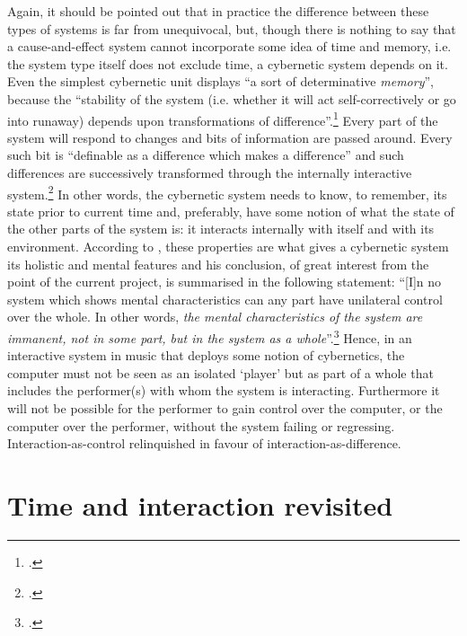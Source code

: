 Again, it should be pointed out that in practice the difference between these types of systems is far from unequivocal, but, though there is nothing to say that a cause-and-effect system cannot incorporate some idea of time and memory, i.e. the system type itself does not exclude time, a cybernetic system depends on it. Even the simplest cybernetic unit displays ``a sort of determinative \emph{memory}'', because the ``stability of the system (i.e. whether it will act self-correctively or go into runaway) depends upon transformations of difference''.\footcite[317]{bateson72:cyber-self} Every part of the system will respond to changes and bits of information are passed around. Every such bit is ``definable as a difference which makes a difference'' and such differences are successively transformed through the internally interactive system.\footcite[315]{bateson72:cyber-self} In other words, the cybernetic system needs to know, to remember, its state prior to current time and, preferably, have some notion of what the state of the other parts of the system is: it interacts internally with itself and with its environment. According to \citeauthor{bateson72:cyber-self}, these properties are what gives a cybernetic system its holistic and mental features and his conclusion, of great interest from the point of the current project, is summarised in the following statement: ``[I]n no system which shows mental characteristics can any part have unilateral control over the whole. In other words, \emph{the mental characteristics of the system are immanent, not in some part, but in the system as a whole}''.\footcite[p. 316 (Italics by the author.)]{bateson72:cyber-self} Hence, in an interactive system in music that deploys some notion of cybernetics, the computer must not be seen as an isolated `player' but as part of a whole that includes the performer(s) with whom the system is interacting. Furthermore it will not be possible for the performer to gain control over the computer, or the computer over the performer, without the system failing or regressing. Interaction-as-control relinquished in favour of interaction-as-difference.

\section{Time and interaction revisited}
\label{sec:time-inter-revis}


